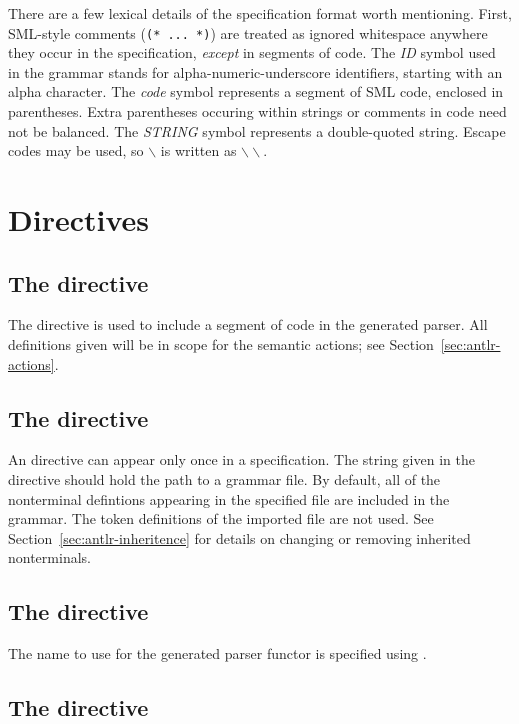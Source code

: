 There are a few lexical details of the specification format worth mentioning.  First, SML-style comments (\texttt{(* ... *)}) are treated as ignored whitespace anywhere they occur in the specification, \emph{except} in segments of code.  The \textit{ID} symbol used in the grammar stands for alpha-numeric-underscore identifiers, starting with an alpha character.  The \textit{code} symbol represents a segment of SML code, enclosed in parentheses.  Extra parentheses occuring within strings or comments in code need not be balanced.  The \textit{STRING} symbol represents a double-quoted string.  Escape codes may be used, so $\backslash$ is written as $\backslash\backslash$.

\section{Directives}

\subsection{The  directive}

The  directive is used to include a segment of code in the generated parser.  All definitions given will be in scope for the semantic actions; see Section~\ref{sec:antlr-actions}.

\subsection{The  directive}

An  directive can appear only once in a specification.  The string given in the directive should hold the path to a grammar file.  By default, all of the nonterminal defintions appearing in the specified file are included in the grammar.  The token definitions of the imported file are not used.  See Section~\ref{sec:antlr-inheritence} for details on changing or removing inherited nonterminals.

\subsection{The  directive}

The name to use for the generated parser functor is specified using .

\subsection{The  directive}

